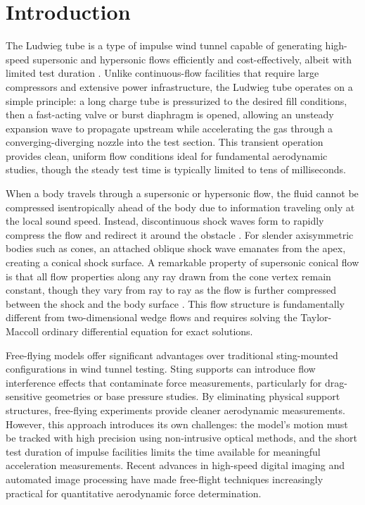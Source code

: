 \section{Introduction} \label{sec:introduction}

The Ludwieg tube is a type of impulse wind tunnel capable of generating high-speed supersonic and hypersonic flows efficiently and cost-effectively, albeit with limited test duration \cite{slaurence2026ludwieg}. Unlike continuous-flow facilities that require large compressors and extensive power infrastructure, the Ludwieg tube operates on a simple principle: a long charge tube is pressurized to the desired fill conditions, then a fast-acting valve or burst diaphragm is opened, allowing an unsteady expansion wave to propagate upstream while accelerating the gas through a converging-diverging nozzle into the test section. This transient operation provides clean, uniform flow conditions ideal for fundamental aerodynamic studies, though the steady test time is typically limited to tens of milliseconds.

When a body travels through a supersonic or hypersonic flow, the fluid cannot be compressed isentropically ahead of the body due to information traveling only at the local sound speed. Instead, discontinuous shock waves form to rapidly compress the flow and redirect it around the obstacle \cite{danderson2023fundamentals}. For slender axisymmetric bodies such as cones, an attached oblique shock wave emanates from the apex, creating a conical shock surface. A remarkable property of supersonic conical flow is that all flow properties along any ray drawn from the cone vertex remain constant, though they vary from ray to ray as the flow is further compressed between the shock and the body surface \cite{slaurence2026ludwieg}. This flow structure is fundamentally different from two-dimensional wedge flows and requires solving the Taylor-Maccoll ordinary differential equation for exact solutions.

Free-flying models offer significant advantages over traditional sting-mounted configurations in wind tunnel testing. Sting supports can introduce flow interference effects that contaminate force measurements, particularly for drag-sensitive geometries or base pressure studies. By eliminating physical support structures, free-flying experiments provide cleaner aerodynamic measurements. However, this approach introduces its own challenges: the model's motion must be tracked with high precision using non-intrusive optical methods, and the short test duration of impulse facilities limits the time available for meaningful acceleration measurements. Recent advances in high-speed digital imaging and automated image processing have made free-flight techniques increasingly practical for quantitative aerodynamic force determination.

